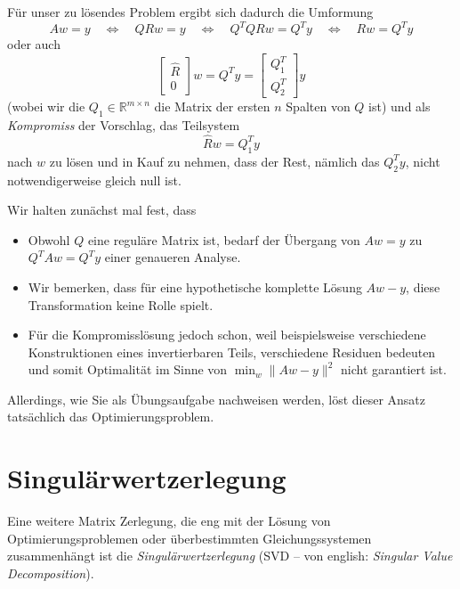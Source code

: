 \documentclass[]{book}
\providecommand{\tightlist}{%
  \setlength{\itemsep}{0pt}\setlength{\parskip}{0pt}}
\theoremstyle{definition}
\theoremstyle{definition}
\theoremstyle{definition}
\theoremstyle{definition}
\theoremstyle{remark}
\begin{document}
Für unser zu lösendes Problem ergibt sich dadurch die Umformung
\begin{equation*}
Aw = y \quad \Leftrightarrow \quad QRw=y \quad \Leftrightarrow \quad Q^TQRw=Q^T y 
 \quad \Leftrightarrow \quad  Rw = Q^Ty
\end{equation*}
oder auch
\begin{equation*}
\begin{bmatrix}
\hat R \\ 0
\end{bmatrix}w 
=
Q^Ty
=
\begin{bmatrix}
Q_1^T \\ Q_2^T
\end{bmatrix}
y
\end{equation*}
(wobei wir die \(Q_1\in \mathbb R^{m\times n}\) die Matrix der ersten \(n\) Spalten von \(Q\) ist)
und als \emph{Kompromiss} der Vorschlag, das Teilsystem
\begin{equation*}
\hat R w = Q_1^Ty
\end{equation*}
nach \(w\) zu lösen und in Kauf zu nehmen, dass der Rest, nämlich das \(Q_2^Ty\), nicht notwendigerweise gleich null ist.

Wir halten zunächst mal fest, dass

\begin{itemize}
\tightlist
\item
  Obwohl \(Q\) eine reguläre Matrix ist, bedarf der Übergang von \(Aw=y\) zu \(Q^TAw=Q^Ty\) einer genaueren Analyse.
\item
  Wir bemerken, dass für eine hypothetische komplette Lösung \(Aw-y\), diese Transformation keine Rolle spielt.
\item
  Für die Kompromisslösung jedoch schon, weil beispielsweise verschiedene Konstruktionen eines invertierbaren Teils, verschiedene Residuen bedeuten und somit Optimalität im Sinne von \(\min_w \|Aw-y\|^2\) nicht garantiert ist.
\end{itemize}

Allerdings, wie Sie als Übungsaufgabe nachweisen werden, löst dieser Ansatz tatsächlich das Optimierungsproblem.

\hypertarget{singuluxe4rwertzerlegung}{%
\section{Singulärwertzerlegung}\label{singuluxe4rwertzerlegung}}

Eine weitere Matrix Zerlegung, die eng mit der Lösung von Optimierungsproblemen oder überbestimmten Gleichungssystemen zusammenhängt ist die \emph{Singulärwertzerlegung} (SVD -- von english: \emph{Singular Value Decomposition}).
\end{document}
